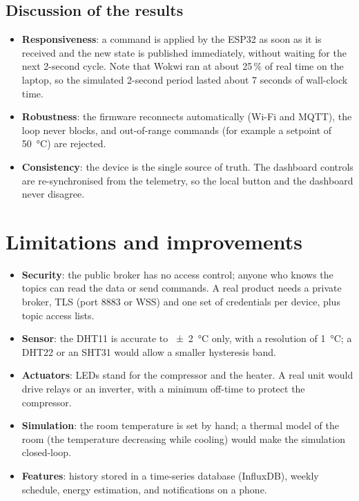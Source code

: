 \documentclass[11pt,a4paper]{article}
\begin{document}
\subsection{Discussion of the results}
\begin{itemize}
  \item \textbf{Responsiveness}: a command is applied by the ESP32 as soon as it is received and
        the new state is published immediately, without waiting for the next 2-second cycle.
        Note that Wokwi ran at about 25\,\% of real time on the laptop, so the simulated
        2-second period lasted about 7 seconds of wall-clock time.
  \item \textbf{Robustness}: the firmware reconnects automatically (Wi-Fi and MQTT), the loop
        never blocks, and out-of-range commands (for example a setpoint of \SI{50}{\celsius})
        are rejected.
  \item \textbf{Consistency}: the device is the single source of truth. The dashboard controls
        are re-synchronised from the telemetry, so the local button and the dashboard never
        disagree.
\end{itemize}

\section{Limitations and improvements}
\begin{itemize}
  \item \textbf{Security}: the public broker has no access control; anyone who knows the topics
        can read the data or send commands. A real product needs a private broker, TLS
        (port 8883 or WSS) and one set of credentials per device, plus topic access lists.
  \item \textbf{Sensor}: the DHT11 is accurate to \SI{\pm 2}{\celsius} only, with a resolution of
        \SI{1}{\celsius}; a DHT22 or an SHT31 would allow a smaller hysteresis band.
  \item \textbf{Actuators}: LEDs stand for the compressor and the heater. A real unit would drive
        relays or an inverter, with a minimum off-time to protect the compressor.
  \item \textbf{Simulation}: the room temperature is set by hand; a thermal model of the room
        (the temperature decreasing while cooling) would make the simulation closed-loop.
  \item \textbf{Features}: history stored in a time-series database (InfluxDB), weekly schedule,
        energy estimation, and notifications on a phone.
\end{itemize}
\end{document}
